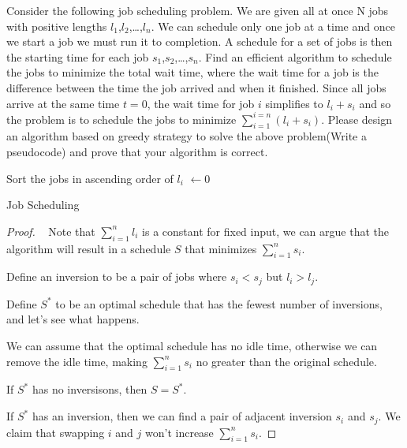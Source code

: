 
\begin{exercise}[]{Consider the following job scheduling problem. We are given all at once N jobs with positive lengths $l_1$,$l_2$,…,$l_n$. We can schedule only one job at a time and once we start a job we must run it to completion. A schedule for a set of jobs is then the starting time for each job $s_1$,$s_2$,…,$s_n$. Find an efficient algorithm to schedule the jobs to minimize the total wait time, where the wait time for a job is the difference between the time the job arrived and when it finished. Since all jobs arrive at the same time $t=0$, the wait time for job $i$ simplifies to $l_i+s_i$ and so the problem is to schedule the jobs to minimize $\sum _{i=1}^{i=n} (l_i + s_i)$. Please design an algorithm based on greedy strategy to solve the above problem(Write a pseudocode) and prove that your algorithm is correct.}
  \begin{algorithm}
    \BlankLine
    Sort the jobs in ascending order of $l_i$\;
    \Time $\leftarrow 0$ \;
    \caption{Job Scheduling \label{js1}}
  \end{algorithm}
  \begin{proof}
    \par{~}
    Note that $\sum_{i=1}^n l_i$ is a constant for fixed input, we can argue that the algorithm will result in a schedule $S$ that minimizes $\sum_{i=1}^n s_i$.
    
    Define an inversion to be a pair of jobs where $s_i<s_j$ but $l_i>l_j$.

    Define $S^{*}$ to be an optimal schedule that has the fewest number of inversions, and let’s see what happens.

    We can assume that the optimal schedule has no idle time, otherwise we can remove the idle time, making $\sum_{i=1}^{n} s_i$ no greater than the original schedule.

    If $S^{*}$ has no inversisons, then $S = S^{*}$.

    If $S^{*}$ has an inversion, then we can find a pair of adjacent inversion $s_i$ and $s_j$. We claim that swapping $i$ and $j$ won't increase $\sum_{i=1}^{n} s_i$.


\end{proof}
\end{exercise}
